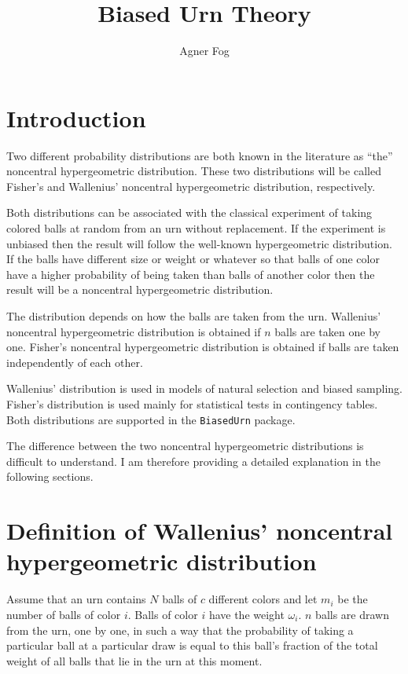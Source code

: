 \documentclass[a4paper]{article}
\begin{document}


\title{Biased Urn Theory}
\author{Agner Fog}

\maketitle

\section{Introduction}
%
Two different probability distributions are both known in the
literature as ``the'' noncentral hypergeometric distribution. These
two distributions will be called Fisher's and Wallenius' noncentral
hypergeometric distribution, respectively. 

Both distributions can be associated with the classical experiment 
of taking colored balls at random from an urn without replacement. 
If the experiment is unbiased then the result will follow the well-known
hypergeometric distribution. If the balls have different size or weight
or whatever so that balls of one color have a higher probability of being
taken than balls of another color then the result will be a
noncentral hypergeometric distribution.

The distribution depends on how the balls are taken from the urn. 
Wallenius' noncentral hypergeometric distribution is obtained if $n$ 
balls are taken one by one. Fisher's noncentral hypergeometric 
distribution is obtained if balls are taken independently of each other.

Wallenius' distribution is used in models of natural selection and biased
sampling. Fisher's distribution is used mainly for statistical tests in
contingency tables. Both distributions are supported in the {\tt BiasedUrn}
package.

The difference between the two noncentral hypergeometric distributions 
is difficult to understand. I am therefore providing a detailed
explanation in the following sections.


\section{Definition of Wallenius' noncentral hypergeometric distribution}
%
Assume that an urn contains $N$ balls of $c$ different colors and let
$m_i$ be the number of balls of color $i$. Balls of color $i$ have the
weight $\omega_i$. $n$ balls are drawn from the urn, one by one, in 
such a way that the probability of taking a particular ball at a 
particular draw is equal to this ball's fraction of the total weight of
all balls that lie in the urn at this moment.
\end{document}
